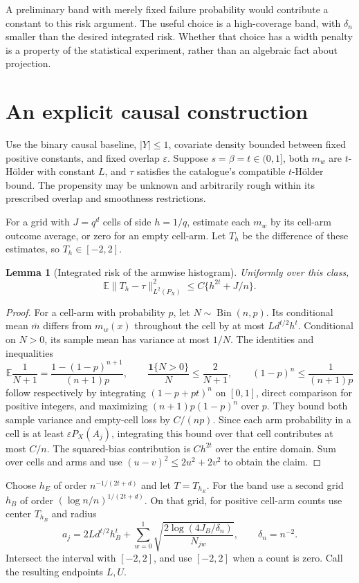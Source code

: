 \documentclass[11pt]{article}
\newtheorem{lemma}[theorem]{Lemma}
\theoremstyle{remark}
\newcommand{\E}{\mathbb E}
\newcommand{\Ind}{\mathbf 1}
\begin{document}
A preliminary band with merely fixed failure probability would contribute a constant to this risk argument. The useful choice is a high-coverage band, with $\delta_n$ smaller than the desired integrated risk. Whether that choice has a width penalty is a property of the statistical experiment, rather than an algebraic fact about projection.

\section{An explicit causal construction}
Use the binary causal baseline, $|Y|\leq1$, covariate density bounded between fixed positive constants, and fixed overlap $\varepsilon$. Suppose $s=\beta=t\in(0,1]$, both $m_w$ are $t$-H\"older with constant $L$, and $\tau$ satisfies the catalogue's compatible $t$-H\"older bound. The propensity may be unknown and arbitrarily rough within its prescribed overlap and smoothness restrictions.

For a grid with $J=q^d$ cells of side $h=1/q$, estimate each $m_w$ by its cell-arm outcome average, or zero for an empty cell-arm. Let $T_h$ be the difference of these estimates, so $T_h\in[-2,2]$.

\begin{lemma}[Integrated risk of the armwise histogram]\label{hist}
Uniformly over this class,
\[
 \E\|T_h-\tau\|_{L^2(P_X)}^2
                  \leq C\{h^{2t}+J/n\}.
\]
\end{lemma}
\begin{proof}
For a cell-arm with probability $p$, let $N\sim\operatorname{Bin}(n,p)$. Its conditional mean $\bar m$ differs from $m_w(x)$ throughout the cell by at most $Ld^{t/2}h^t$. Conditional on $N>0$, its sample mean has variance at most $1/N$. The identities and inequalities
\[
 \E\frac1{N+1}=\frac{1-(1-p)^{n+1}}{(n+1)p},\qquad
 \frac{\Ind\{N>0\}}N\leq\frac2{N+1},\qquad
 (1-p)^n\leq\frac1{(n+1)p}
\]
follow respectively by integrating $(1-p+pt)^n$ on $[0,1]$, direct comparison for positive integers, and maximizing $(n+1)p(1-p)^n$ over $p$. They bound both sample variance and empty-cell loss by $C/(np)$. Since each arm probability in a cell is at least $\varepsilon P_X(A_j)$, integrating this bound over that cell contributes at most $C/n$. The squared-bias contribution is $Ch^{2t}$ over the entire domain. Sum over cells and arms and use $(u-v)^2\leq2u^2+2v^2$ to obtain the claim.
\end{proof}

Choose $h_E$ of order $n^{-1/(2t+d)}$ and let $T=T_{h_E}$. For the band use a second grid $h_B$ of order $(\log n/n)^{1/(2t+d)}$. On that grid, for positive cell-arm counts use center $T_{h_B}$ and radius
\[
 a_j=2Ld^{t/2}h_B^t+
 \sum_{w=0}^1\sqrt{\frac{2\log(4J_B/\delta_n)}{N_{jw}}},
 \qquad \delta_n=n^{-2}.
\]
Intersect the interval with $[-2,2]$, and use $[-2,2]$ when a count is zero. Call the resulting endpoints $L,U$.
\end{document}

